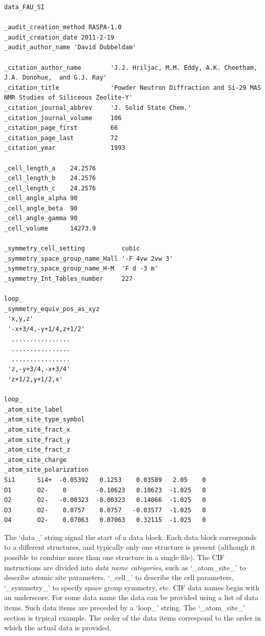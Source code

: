 \begin{footnotesize}
\begin{verbatim}
data_FAU_SI

_audit_creation_method RASPA-1.0
_audit_creation_date 2011-2-19
_audit_author_name 'David Dubbeldam'

_citation_author_name        'J.J. Hriljac, M.M. Eddy, A.K. Cheetham, J.A. Donohue,  and G.J. Ray'
_citation_title              'Powder Neutron Diffraction and Si-29 MAS NMR Studies of Siliceous Zeolite-Y'
_citation_journal_abbrev     'J. Solid State Chem.'
_citation_journal_volume     106
_citation_page_first         66
_citation_page_last          72
_citation_year               1993

_cell_length_a    24.2576
_cell_length_b    24.2576
_cell_length_c    24.2576
_cell_angle_alpha 90
_cell_angle_beta  90
_cell_angle_gamma 90
_cell_volume      14273.9

_symmetry_cell_setting          cubic
_symmetry_space_group_name_Hall '-F 4vw 2vw 3'
_symmetry_space_group_name_H-M  'F d -3 m'
_symmetry_Int_Tables_number     227

loop_
_symmetry_equiv_pos_as_xyz
 'x,y,z'
 '-x+3/4,-y+1/4,z+1/2'
  ................
  ................
  ................
 'z,-y+3/4,-x+3/4'
 'z+1/2,y+1/2,x'

loop_
_atom_site_label
_atom_site_type_symbol
_atom_site_fract_x
_atom_site_fract_y
_atom_site_fract_z
_atom_site_charge
_atom_site_polarization
Si1      Si4+  -0.05392   0.1253    0.03589   2.05    0
O1       O2-    0        -0.10623   0.10623  -1.025   0
O2       O2-   -0.00323  -0.00323   0.14066  -1.025   0
O3       O2-    0.0757    0.0757   -0.03577  -1.025   0
O4       O2-    0.07063   0.07063   0.32115  -1.025   0
\end{verbatim}
\end{footnotesize}

The `data\_' string signal the start of a data block. Each data block corresponds to a different structures, and typically only one structure is present (although it
possible to combine more than one structure in a single file).
The CIF instructions are divided into \emph{data name categories}, such as `\_atom\_site\_' to describe atomic site parameters, `\_cell\_'
to describe the cell parameters, `\_symmetry\_' to specify  space group symmetry, etc.
CIF data names begin with an underscore. For some data name the data can be provided using a list of data items. Such data items are preceded by a `loop\_' string.
The `\_atom\_site\_' section is typical example. The order of the data items correspond to the order in which the actual data is provided.

